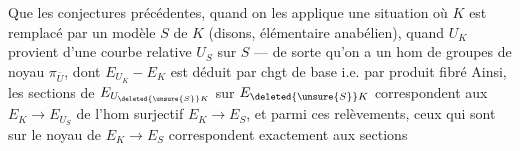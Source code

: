 Que  les conjectures précédentes, quand on les applique  une situation où $K$ est remplacé par un modèle $S$ de $K$ (disons, élémentaire anabélien), quand $U_K$ provient d'une courbe relative $U_S$ sur $S$ — de sorte qu'on a un hom de groupes
de noyau $\pi_{\bar U}$, dont $E_{U_K}-E_K$ est déduit par chgt de base i.e. par produit fibré
Ainsi, les sections de $E_{U_{\deleted{\unsure{S}}K}}$ sur $E_{\deleted{\unsure{S}}K}$ correspondent aux   $E_K\longrightarrow E_{U_S}$ de l'hom surjectif $E_K\longrightarrow E_S$, et parmi ces relèvements, ceux qui sont   sur le noyau de $E_K\longrightarrow E_S$ correspondent exactement aux sections

